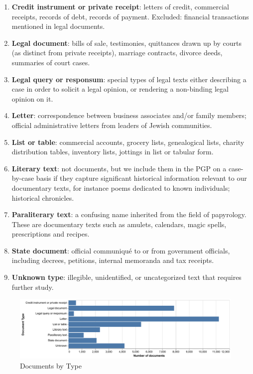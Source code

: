 \documentclass{article}
\begin{document}
\begin{enumerate}
    \item     \textbf{Credit instrument or private receipt}: letters of credit, commercial receipts, records of debt, records of payment. Excluded: financial transactions mentioned in legal documents.
    \item \textbf{Legal document}: bills of sale, testimonies, quittances drawn up by courts (as distinct from private receipts), marriage contracts, divorce deeds, summaries of court cases.
    \item \textbf{Legal query or responsum}: special types of legal texts either describing a case in order to solicit a legal opinion, or rendering a non-binding legal opinion on it.
    \item \textbf{Letter}: correspondence between business associates and/or family members; official administrative letters from leaders of Jewish communities.
    \item \textbf{List or table}: commercial accounts, grocery lists, genealogical lists, charity distribution tables, inventory lists, jottings in list or tabular form.
    \item \textbf{Literary text}: not documents, but we include them in the PGP on a case-by-case basis if they capture significant historical information relevant to our documentary texts, for instance poems dedicated to known individuals; historical chronicles.
    \item \textbf{Paraliterary text}: a confusing name inherited from the field of papyrology. These are documentary texts such as amulets, calendars, magic spells, prescriptions and recipes.
    \item \textbf{State document}: official communiqué to or from government officials, including decrees, petitions, internal memoranda and tax receipts.
    \item \textbf{Unknown type}: illegible, unidentified, or uncategorized text that requires further study.
\end{enumerate}


\begin{figure}[!hbt]
  \centering
  \includegraphics[width=1\linewidth]{charts/document_types.pdf}
  \caption{Documents by Type}
  \label{fig:document_types}
\end{figure}
\end{document}

